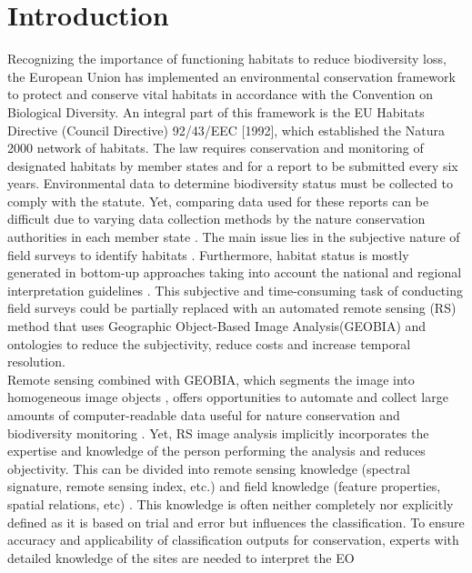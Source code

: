 \documentclass[authoryear, review,12pt,number]{elsarticle}
\begin{document}
\section{Introduction}
Recognizing the importance of functioning habitats to reduce biodiversity loss, 
the European Union has implemented an environmental conservation framework to 
protect and conserve vital habitats in accordance with the Convention on 
Biological Diversity. An integral part of this framework is the EU 
Habitats Directive (Council Directive) 92/43/EEC [1992], which established the 
Natura 2000 network of habitats. The law requires conservation and monitoring 
of designated habitats by member states and for a report to be submitted every 
six years. Environmental data to determine biodiversity status must be 
collected to comply with the statute. Yet, comparing data used for these reports 
can be difficult due to varying data collection methods by the nature 
conservation authorities in each member state \citep{INSPIREdataspecs, INSPIRE}. 
The main issue lies in the subjective nature of field surveys to identify 
habitats \citep{Cherrill1999, Cherrill1999a, Nieland2015}. Furthermore, habitat 
status is mostly generated in bottom-up approaches taking into account the 
national and regional interpretation guidelines \citep{INSPIREdataspecs}. This 
subjective and time-consuming task of conducting field surveys could be 
partially replaced with an automated remote sensing (RS) method that uses  
Geographic Object-Based Image Analysis(GEOBIA) and ontologies to reduce the 
subjectivity, reduce costs and increase temporal resolution.
\\
Remote sensing combined with GEOBIA, which segments the image into homogeneous 
image objects \citep{Blaschke2010}, offers opportunities to automate and 
collect large amounts of computer-readable data useful for nature conservation 
and biodiversity monitoring \citep{Corbane2015, VandenBorre2011, Mayer2011}. 
Yet, RS image analysis implicitly incorporates the expertise and knowledge of 
the person performing the analysis and reduces objectivity. This can be divided 
into remote sensing knowledge (spectral signature, remote sensing index, etc.) 
and field knowledge (feature properties, spatial relations, etc) 
\citep{Andres2013a}. This knowledge is often neither completely nor explicitly 
defined as it is based on trial and error but influences the classification. To 
ensure accuracy and applicability of classification outputs for conservation, 
experts with detailed knowledge of the sites are needed to interpret the EO 
\end{document}
